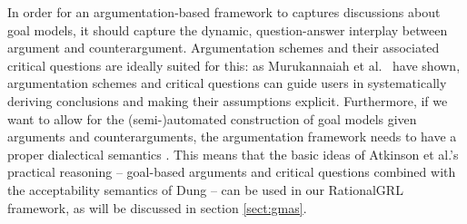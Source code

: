 In order for an argumentation-based framework to captures discussions about goal models, it should capture the dynamic, question-answer interplay between argument and counterargument. Argumentation schemes and their associated critical questions are ideally suited for this: as Murukannaiah et al.~\cite{murukannaiah2015} have shown, argumentation schemes and critical questions can guide users in systematically deriving conclusions and making their assumptions explicit. Furthermore, if we want to allow for the (semi-)automated construction of goal models given arguments and counterarguments, the argumentation framework needs to have a proper dialectical semantics \cite{Dung1995}. This means that the basic ideas of Atkinson et al.'s~\cite{atkinson2007} practical reasoning -- goal-based arguments and critical questions combined with the acceptability semantics of Dung -- can be used in our RationalGRL framework, as will be discussed in section \ref{sect:gmas}. 
